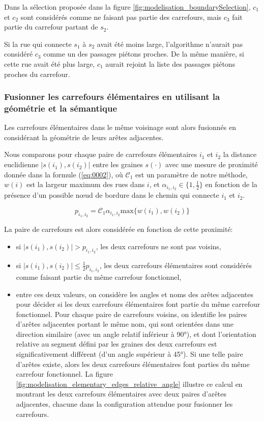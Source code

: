 \newpar{}

Dans la sélection proposée dans la figure \ref{fig:modelisation_boundarySelection}, $c_1$ et $c_2$ sont considérés comme ne faisant pas partie des carrefours, mais $c_3$ fait partie du carrefour partant de $s_2$.

Si la rue qui connecte $s_1$ à $s_2$ avait été moins large, l'algorithme n'aurait pas considéré $c_3$ comme un des passages piétons proches. De la même manière, si cette rue avait été plus large, $c_1$ aurait rejoint la liste des passages piétons proches du carrefour.

\subsubsection{Fusionner les carrefours élémentaires en utilisant la géométrie et la sémantique}

Les carrefours élémentaires dans le même voisinage sont alors fusionnés en considérant la géométrie de leurs arêtes adjacentes.

Nous comparons pour chaque paire de carrefours élémentaires $i_1$ et $i_2$ la distance euclidienne 
$|s(i_1), s(i_2)|$ entre les graines $s(\cdot)$ avec une mesure de proximité donnée dans la formule (\ref{eq:0002}), où $\mathcal{C}_1$ est un paramètre de notre méthode, $w(i)$ est la largeur maximum des rues dans $i$, et $\alpha_{i_1, i_2} \in \{ 1, \frac{1}{2} \}$ en fonction de la présence d'un possible nœud de bordure dans le chemin qui connecte $i_1$ et $i_2$.

\begin{equation}
 p_{i_1, i_2} = \mathcal{C}_1 \alpha_{i_1, i_2} \mathrm{max} \{ w(i_1), w(i_2) \}
 \label{eq:0002}
\end{equation}

La paire de carrefours est alors considérée en fonction de cette proximité:
\begin{itemize}
    \item si $|s(i_1), s(i_2)| > p_{i_1, i_2}$, les deux carrefours ne sont pas voisins,
    \item si $|s(i_1), s(i_2)| \leq \frac{1}{2} p_{i_1, i_2}$, les deux carrefours élémentaires sont considérés comme faisant partie du même carrefour fonctionnel,
    \item entre ces deux valeurs, on considère les angles et noms des arêtes adjacentes pour décider si les deux carrefours élémentaires font partie du même carrefour fonctionnel. Pour chaque paire de carrefours voisins, on identifie les paires d'arêtes adjacentes portant le même nom, qui sont orientées dans une direction similaire (avec un angle relatif inférieur à 90°), et dont l'orientation relative au segment défini par les graines des deux carrefours est significativement différent (d'un angle supérieur à 45°). Si une telle paire d'arêtes existe, alors les deux carrefours élémentaires font parties du même carrefour fonctionnel. La figure \ref{fig:modelisation_elementary_edges_relative_angle} illustre ce calcul en montrant les deux carrefours élémentaires avec deux paires d'arêtes adjacentes, chacune dans la configuration attendue pour fusionner les carrefours.
\end{itemize}

